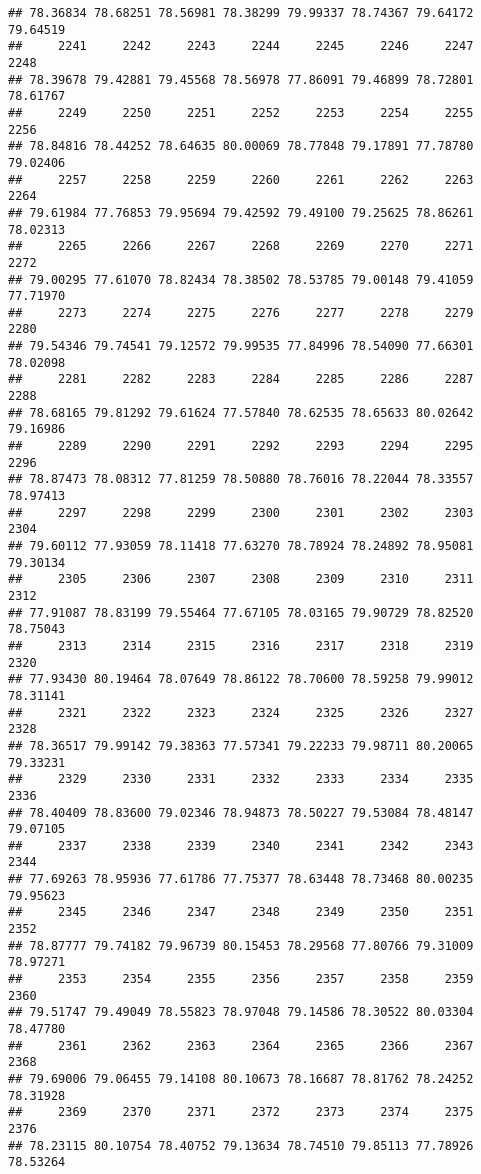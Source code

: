 \documentclass[
]{article}
\begin{document}
\begin{verbatim}
## 78.36834 78.68251 78.56981 78.38299 79.99337 78.74367 79.64172 79.64519 
##     2241     2242     2243     2244     2245     2246     2247     2248 
## 78.39678 79.42881 79.45568 78.56978 77.86091 79.46899 78.72801 78.61767 
##     2249     2250     2251     2252     2253     2254     2255     2256 
## 78.84816 78.44252 78.64635 80.00069 78.77848 79.17891 77.78780 79.02406 
##     2257     2258     2259     2260     2261     2262     2263     2264 
## 79.61984 77.76853 79.95694 79.42592 79.49100 79.25625 78.86261 78.02313 
##     2265     2266     2267     2268     2269     2270     2271     2272 
## 79.00295 77.61070 78.82434 78.38502 78.53785 79.00148 79.41059 77.71970 
##     2273     2274     2275     2276     2277     2278     2279     2280 
## 79.54346 79.74541 79.12572 79.99535 77.84996 78.54090 77.66301 78.02098 
##     2281     2282     2283     2284     2285     2286     2287     2288 
## 78.68165 79.81292 79.61624 77.57840 78.62535 78.65633 80.02642 79.16986 
##     2289     2290     2291     2292     2293     2294     2295     2296 
## 78.87473 78.08312 77.81259 78.50880 78.76016 78.22044 78.33557 78.97413 
##     2297     2298     2299     2300     2301     2302     2303     2304 
## 79.60112 77.93059 78.11418 77.63270 78.78924 78.24892 78.95081 79.30134 
##     2305     2306     2307     2308     2309     2310     2311     2312 
## 77.91087 78.83199 79.55464 77.67105 78.03165 79.90729 78.82520 78.75043 
##     2313     2314     2315     2316     2317     2318     2319     2320 
## 77.93430 80.19464 78.07649 78.86122 78.70600 78.59258 79.99012 78.31141 
##     2321     2322     2323     2324     2325     2326     2327     2328 
## 78.36517 79.99142 79.38363 77.57341 79.22233 79.98711 80.20065 79.33231 
##     2329     2330     2331     2332     2333     2334     2335     2336 
## 78.40409 78.83600 79.02346 78.94873 78.50227 79.53084 78.48147 79.07105 
##     2337     2338     2339     2340     2341     2342     2343     2344 
## 77.69263 78.95936 77.61786 77.75377 78.63448 78.73468 80.00235 79.95623 
##     2345     2346     2347     2348     2349     2350     2351     2352 
## 78.87777 79.74182 79.96739 80.15453 78.29568 77.80766 79.31009 78.97271 
##     2353     2354     2355     2356     2357     2358     2359     2360 
## 79.51747 79.49049 78.55823 78.97048 79.14586 78.30522 80.03304 78.47780 
##     2361     2362     2363     2364     2365     2366     2367     2368 
## 79.69006 79.06455 79.14108 80.10673 78.16687 78.81762 78.24252 78.31928 
##     2369     2370     2371     2372     2373     2374     2375     2376 
## 78.23115 80.10754 78.40752 79.13634 78.74510 79.85113 77.78926 78.53264 

\end{verbatim}
\end{document}
